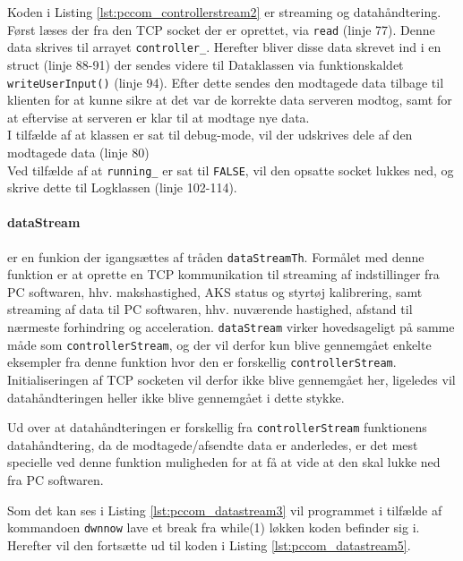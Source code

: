 Koden i Listing \ref{lst:pccom_controllerstream2} er streaming og datahåndtering. Først læses der fra den TCP socket der er oprettet, via \texttt{read} (linje 77). Denne data skrives til arrayet \texttt{controller\_}. Herefter bliver disse data skrevet ind i en struct (linje 88-91) der sendes videre til Dataklassen via funktionskaldet \texttt{writeUserInput()} (linje 94). Efter dette sendes den modtagede data tilbage til klienten for at kunne sikre at det var de korrekte data serveren modtog, samt for at eftervise at serveren er klar til at modtage nye data.\\
I tilfælde af at klassen er sat til debug-mode, vil der udskrives dele af den modtagede data (linje 80)\\
Ved tilfælde af at \texttt{running\_} er sat til \texttt{FALSE}, vil den opsatte socket lukkes ned, og skrive dette til Logklassen (linje 102-114).

\paragraph{dataStream} er en funkion der igangsættes af tråden \texttt{dataStreamTh}. 
Formålet med denne funktion er at oprette en TCP kommunikation til streaming af indstillinger fra PC softwaren, 
hhv. makshastighed, AKS status og styrtøj kalibrering, samt streaming af data til PC softwaren, hhv. nuværende hastighed, afstand til nærmeste forhindring og acceleration. 
\texttt{dataStream} virker hovedsageligt på samme måde som \texttt{controllerStream}, og der vil derfor kun blive gennemgået enkelte eksempler fra denne funktion hvor den er forskellig \texttt{controllerStream}. 
Initialiseringen af TCP socketen vil derfor ikke blive gennemgået her, ligeledes vil datahåndteringen heller ikke blive gennemgået i dette stykke.

Ud over at datahåndteringen er forskellig fra \texttt{controllerStream} funktionens datahåndtering, da de modtagede/afsendte data er anderledes, er det mest specielle ved denne funktion muligheden for at få at vide at den skal lukke ned fra PC softwaren. 



Som det kan ses i Listing \ref{lst:pccom_datastream3} vil programmet i tilfælde af kommandoen \texttt{dwnnow} lave et break fra while(1) løkken koden befinder sig i. Herefter vil den fortsætte ud til koden i Listing \ref{lst:pccom_datastream5}.

